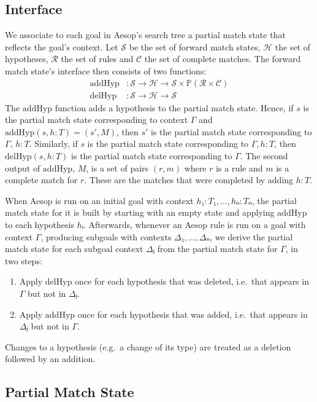 \documentclass[runningheads]{llncs}
\newcommand{\Rules}{\ensuremath{\mathcal{R}}}
\newcommand{\Hyps}{\ensuremath{\mathcal{H}}}
\newcommand{\States}{\ensuremath{\mathcal{S}}}
\newcommand{\CMatches}{\ensuremath{\mathcal{C}}}
\newcommand{\addHyp}{\ensuremath{\mathrm{addHyp}}}
\newcommand{\delHyp}{\ensuremath{\mathrm{delHyp}}}
\newcommand{\powerset}{\ensuremath{\mathbb{P}}}
\begin{document}
\subsection{Interface}

We associate to each goal in Aesop's search tree a partial match state that reflects the goal's context.
Let $\States$ be the set of forward match states, $\Hyps$ the set of hypotheses, $\Rules$ the set of rules and $\CMatches$ the set of complete matches.
The forward match state's interface then consists of two functions:
\begin{align*}
  \addHyp &: \States → \Hyps → \States × \powerset(\Rules × \CMatches) \\
  \delHyp &: \States → \Hyps → \States
\end{align*}
The $\addHyp$ function adds a hypothesis to the partial match state.
Hence, if $s$ is the partial match state corresponding to context $Γ$ and $\addHyp(s, h : T) = (s', M)$, then $s'$ is the partial match state corresponding to $Γ,\, h : T$.
Similarly, if $s$ is the partial match state corresponding to $Γ, h : T$, then $\delHyp(s, h : T)$ is the partial match state corresponding to $Γ$.
The second output of $\addHyp$, $M$, is a set of pairs $(r, m)$ where $r$ is a rule and $m$ is a complete match for $r$.
These are the matches that were completed by adding $h : T$.

When Aesop is run on an initial goal with context $h₁ : T₁, \dots, hₙ : Tₙ$, the partial match state for it is built by starting with an empty state and applying $\addHyp$ to each hypothesis $hᵢ$.
Afterwards, whenever an Aesop rule is run on a goal with context $Γ$, producing subgoals with contexts $Δ₁, \dots, Δₙ$, we derive the partial match state for each subgoal context $Δⱼ$ from the partial match state for $Γ$, in two steps:
\begin{enumerate}
  \item Apply $\delHyp$ once for each hypothesis that was deleted, i.e.\ that appears in $Γ$ but not in $Δⱼ$.
  \item Apply $\addHyp$ once for each hypothesis that was added, i.e.\ that appears in $Δⱼ$ but not in $Γ$.
\end{enumerate}
Changes to a hypothesis (e.g.\ a change of its type) are treated as a deletion followed by an addition.

\subsection{Partial Match State}%
\label{sec:state}
\end{document}

